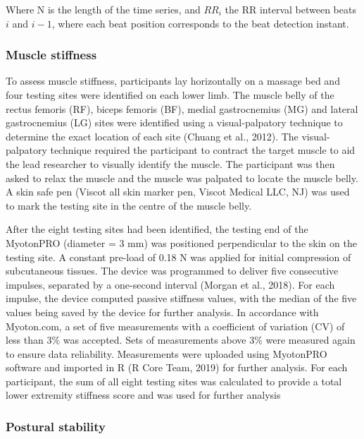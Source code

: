 \documentclass[
  english,
  man]{apa6}
\begin{document}
Where N is the length of the time series, and \(RR_i\) the RR interval between beats \(i\) and \(i-1\), where each beat position corresponds to the beat detection instant.

\hypertarget{muscle-stiffness}{%
\subsubsection{Muscle stiffness}\label{muscle-stiffness}}

To assess muscle stiffness, participants lay horizontally on a massage bed and four testing sites were identified on each lower limb.
The muscle belly of the rectus femoris (RF), biceps femoris (BF), medial gastrocnemius (MG) and lateral gastrocnemius (LG) sites were identified using a visual-palpatory technique to determine the exact location of each site (Chuang et al., 2012).
The visual-palpatory technique required the participant to contract the target muscle to aid the lead researcher to visually identify the muscle.
The participant was then asked to relax the muscle and the muscle was palpated to locate the muscle belly. A skin safe pen (Viscot all skin marker pen, Viscot Medical LLC, NJ) was used to mark the testing site in the centre of the muscle belly.

After the eight testing sites had been identified, the testing end of the MyotonPRO (diameter = 3 mm) was positioned perpendicular to the skin on the testing site.
A constant pre-load of 0.18 N was applied for initial compression of subcutaneous tissues.
The device was programmed to deliver five consecutive impulses, separated by a one-second interval (Morgan et al., 2018).
For each impulse, the device computed passive stiffness values, with the median of the five values being saved by the device for further analysis. In accordance with Myoton.com, a set of five measurements with a coefficient of variation (CV) of less than 3\% was accepted. Sets of measurements above 3\% were measured again to ensure data reliability.
Measurements were uploaded using MyotonPRO software and imported in R (R Core Team, 2019) for further analysis. For each participant, the sum of all eight testing sites was calculated to provide a total lower extremity stiffness score and was used for further analysis

\hypertarget{postural-stability-1}{%
\subsubsection{Postural stability}\label{postural-stability-1}}
\end{document}
